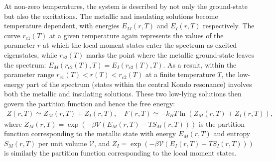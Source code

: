 \documentclass{iopart}
\begin{document}
At non-zero temperatures, the system is described by not only the ground-state but also the excitations. The metallic and insulating solutions become temperature dependent, with energies \(E_M(r,T)\) and \(E_I(r,T)\) respectively. The curve \(r_{c1}(T)\) at a given temperature again represents the values of the parameter \(r\) at which the local moment states enter the spectrum as excited eigenstates, while \(r_{c2}(T)\) marks the point where the metallic ground-state leaves the spectrum: \(E_M(r_{c2}(T), T) = E_I(r_{c2}(T), T)\). As a result, within the parameter range \(r_{c1}(T) < r(T) < r_{c2}(T)\) at a finite temperature \(T\), the low-energy part of the spectrum (states within the central Kondo resonance) involves both the metallic and insulating solutions. These two low-lying solutions then govern the partition function and hence the free energy:
\begin{eqnarray}
	Z(r,T) \simeq Z_M(r,T) + Z_I(r,T),\quad F(r,T) \simeq -k_B T \ln \left(Z_M(r,T) + Z_I(r,T)\right),\label{free energy eq}
\end{eqnarray}
where \(Z_M(r,T) = \exp{\left(-\beta \mathcal{V}\left(E_M(r,T) - TS_M(r,T)\right)\right)}\) is the partition function corresponding to the metallic state with energy \(E_M(r,T)\) and entropy \(S_M(r,T)\) per unit volume \(\mathcal{V}\), and \(Z_I = \exp{\left(-\beta \mathcal{V}\left(E_I(r,T) - TS_I(r,T)\right)\right)}\) is similarly the partition function corresponding to the local moment states.
\end{document}
